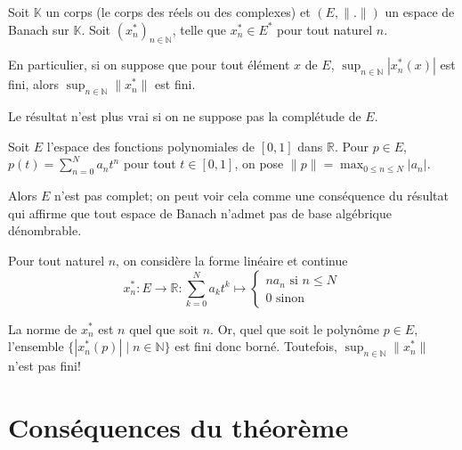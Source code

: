 Soit $ \mathbb K$ un corps (le corps des réels ou des complexes)
et $(E, \|.\|)$ un espace de Banach sur $\mathbb K$. Soit
$(x^*_n)_{n\in\mathbb N}$, telle que $x^*_n\in E^*$ pour tout naturel $n$.

En particulier, si on suppose que pour tout élément $x$ de $E$,
$\sup_{n\in\mathbb N}|x^*_n(x)|$ est fini, alors
$\sup_{n\in\mathbb N}\|x^*_n\|$  est fini.

Le résultat n'est plus vrai si on ne suppose pas la complétude de
$E$.
\begin{ex}
  Soit $E$ l'espace des fonctions polynomiales de $[0, 1]$
  dans $\mathbb R$. Pour $p\in E$, $p(t) =
  \sum_{n=0}^Na_n t^n$ pour tout $t\in [0, 1]$, on pose
  $\|p\| = \max_{0\leq n\leq N}|a_n|$.

  Alors $E$ n'est pas complet; on peut voir cela comme une conséquence
  du résultat qui affirme que tout espace de Banach n'admet pas
  de base algébrique dénombrable.



  Pour tout naturel $n$, on considère la forme linéaire et continue
  \begin{equation*}
  x^*_n: E\to \mathbb R: \sum_{k=0}^Na_kt^k\mapsto
  \begin{cases}
    n a_n \mbox{ si $n\leq N$} \\
    0 \mbox{ sinon}
  \end{cases}
  \end{equation*}

  La norme de $x^*_n$ est $n$ quel que soit $n$. Or, quel que
  soit le polynôme $p\in E$, l'ensemble $\{|x^*_n(p)|\mid n\in\mathbb N\}$
  est fini donc borné. Toutefois, $\sup_{n\in\mathbb N} \|x^*_n\|$
  n'est pas fini!
\end{ex}

\section{Conséquences du théorème}

